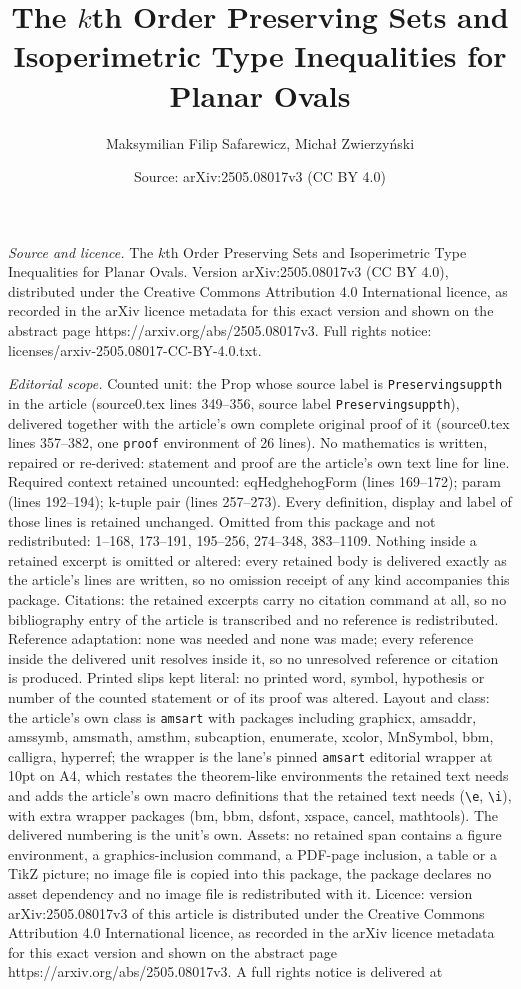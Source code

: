 \documentclass[10pt,a4paper]{amsart}
\title[The $k$th Order Preserving Sets and Isoperimetric Type Inequ]{The $k$th Order Preserving Sets and Isoperimetric Type Inequalities for Planar Ovals}
\author{Maksymilian Filip Safarewicz, Micha{\l} Zwierzy\'nski}
\date{Source: arXiv:2505.08017v3 (CC BY 4.0)}
\begin{document}
\maketitle

\noindent\emph{Source and licence.} The $k$th Order Preserving Sets and Isoperimetric Type Inequalities for Planar Ovals. Version arXiv:2505.08017v3 (CC BY 4.0), distributed under the Creative Commons Attribution 4.0 International licence, as recorded in the arXiv licence metadata for this exact version and shown on the abstract page https://arxiv.org/abs/2505.08017v3. Full rights notice: licenses/arxiv-2505.08017-CC-BY-4.0.txt.\par\smallskip

\noindent\textit{Editorial scope.} Counted unit: the Prop whose source label is \texttt{Preservingsuppth} in the article (source0.tex lines 349--356, source label \texttt{Preservingsuppth}), delivered together with the article's own complete original proof of it (source0.tex lines 357--382, one \texttt{proof} environment of 26 lines). No mathematics is written, repaired or re-derived: statement and proof are the article's own text line for line. Required context retained uncounted: eqHedghehogForm (lines 169--172); param (lines 192--194); k-tuple pair (lines 257--273). Every definition, display and label of those lines is retained unchanged. Omitted from this package and not redistributed: 1--168, 173--191, 195--256, 274--348, 383--1109. Nothing inside a retained excerpt is omitted or altered: every retained body is delivered exactly as the article's lines are written, so no omission receipt of any kind accompanies this package. Citations: the retained excerpts carry no citation command at all, so no bibliography entry of the article is transcribed and no reference is redistributed. Reference adaptation: none was needed and none was made; every reference inside the delivered unit resolves inside it, so no unresolved reference or citation is produced. Printed slips kept literal: no printed word, symbol, hypothesis or number of the counted statement or of its proof was altered. Layout and class: the article's own class is \texttt{amsart} with packages including graphicx, amsaddr, amssymb, amsmath, amsthm, subcaption, enumerate, xcolor, MnSymbol, bbm, calligra, hyperref; the wrapper is the lane's pinned \texttt{amsart} editorial wrapper at 10pt on A4, which restates the theorem-like environments the retained text needs and adds the article's own macro definitions that the retained text needs (\texttt{\textbackslash e}, \texttt{\textbackslash i}), with extra wrapper packages (bm, bbm, dsfont, xspace, cancel, mathtools). The delivered numbering is the unit's own. Assets: no retained span contains a figure environment, a graphics-inclusion command, a PDF-page inclusion, a table or a TikZ picture; no image file is copied into this package, the package declares no asset dependency and no image file is redistributed with it. Licence: version arXiv:2505.08017v3 of this article is distributed under the Creative Commons Attribution 4.0 International licence, as recorded in the arXiv licence metadata for this exact version and shown on the abstract page https://arxiv.org/abs/2505.08017v3. A full rights notice is delivered at 
\end{document}
